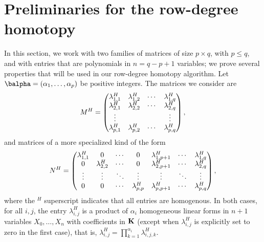\documentclass[12pt]{article}
\begin{document}


\section{Preliminaries for the row-degree homotopy}\label{sec:prel-row}

In this section, we work with two families of matrices of size $p
\times q$, with $p \le q$, and with entries that are polynomials in
$n=q-p+1$ variables; we prove several properties that will be used 
in our row-degree homotopy algorithm. Let $\balpha=(\alpha_1,\dots,\alpha_p)$
be positive integers. The matrices we consider are
\begin{align}\label{eqdef:type2}
{M}^H= \left( \begin{matrix}
\lambda^H_{1,1} & \lambda^H_{1,2} & \cdots & \lambda^H_{1, q}\\
 \lambda^H_{2,1} &  \lambda^H_{2,2} & \cdots & \lambda^H_{2, q}\\
 \vdots & & & \vdots\\
 \lambda^H_{p,1} &  \lambda^H_{p,2}& \cdots & \lambda^H_{p, q}
\end{matrix} \right),
\end{align}
and matrices of a more specialized kind of the form
\begin{align}\label{eqdef:type1}
{N}^H= \left( \begin{matrix}
\lambda^H_{1,1} & 0 & \cdots & 0 & \lambda^H_{1,p+1} & \cdots & \lambda^H_{1, q}\\
0 & \lambda^H_{2,2} & \cdots & 0 & \lambda^H_{2,p+1} & \cdots & \lambda^H_{2, q}\\
\vdots & \vdots & \ddots & \vdots & \vdots & \ddots & \vdots\\
0 & 0 & \cdots & \lambda^H_{p,p} & \lambda^H_{p,p+1} & \cdots & \lambda^H_{p, q}
\end{matrix} \right),
\end{align}
where the ${}^H$ superscript indicates that all entries are
homogenous.  In both cases, for all $i,j$, the entry $\lambda^H_{i,j}$
is a product of $\alpha_i$ homogeneous linear forms in $n+1$ variables
$X_0,\dots,X_n$ with coefficients in $\mathbf{K}$ (except when
$\lambda^H_{i,j}$ is explicitly set to zero in the first case), that
is, $\lambda^H_{i,j}=\prod_{k=1}^{\alpha_i} \lambda^H_{i,j,k}$.  
\end{document}
